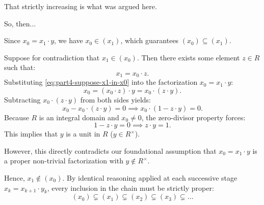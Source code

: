 \begin{proofWrapper}
\begin{speech}[01:07:11 - 01:09:39]

That strictly increasing is what was argued here. 

So, then...
\end{speech}

\begin{content}

Since $x_0 = x_1 \cdot y$, we have $x_0 \in (x_1)$, which guarantees $(x_0) \subseteq (x_1)$.

Suppose for contradiction that $x_1 \in (x_0)$. Then there exists some element $z \in R$ such that:
\begin{equation}\label{eq:part4-suppose-x1-in-x0}
x_1 = x_0 \cdot z.
\end{equation}
Substituting \eqref{eq:part4-suppose-x1-in-x0} into the factorization $x_0 = x_1 \cdot y$:
\begin{equation}\label{eq:part4-subst-cancel}
x_0 = (x_0 \cdot z) \cdot y = x_0 \cdot (z \cdot y).
\end{equation}
Subtracting $x_0 \cdot (z \cdot y)$ from both sides yields:
\begin{equation}\label{eq:part4-cancel-domain}
x_0 - x_0 \cdot (z \cdot y) = 0 \implies x_0 \cdot (1 - z \cdot y) = 0.
\end{equation}
Because $R$ is an integral domain and $x_0 \neq 0$, the zero-divisor property forces:
\begin{equation}\label{eq:part4-zy-one}
1 - z \cdot y = 0 \implies z \cdot y = 1.
\end{equation}
This implies that $y$ is a unit in $R$ ($y \in R^\times$).

However, this directly contradicts our foundational assumption that $x_0 = x_1 \cdot y$ is a proper non-trivial factorization with $y \notin R^\times$.

Hence, $x_1 \notin (x_0)$. By identical reasoning applied at each successive stage $x_k = x_{k+1} \cdot y_k$, every inclusion in the chain must be strictly proper:
\begin{equation}\label{eq:part4-strictly-ascending-chain}
(x_0) \subsetneq (x_1) \subsetneq (x_2) \subsetneq (x_3) \subsetneq \dots
\end{equation}
\end{content}


\end{proofWrapper}

